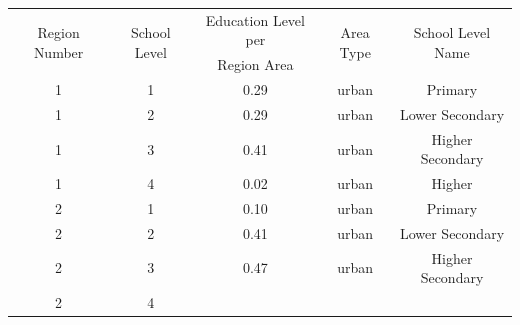 \documentclass[stu, 12pt, floatsintext,longtable]{apa7}
\begin{document}
\begin{longtable}{ccccc}
    \toprule
    \multicolumn{1}{c}{\multirow{2}{*}{Region Number}} &
    \multicolumn{1}{c}{\multirow{2}{*}{School Level}}  &
    \multicolumn{1}{c}{Education Level per}            &
    \multicolumn{1}{c}{\multirow{2}{*}{Area Type}}     &
    \multicolumn{1}{c}{\multirow{2}{*}{School Level Name}}
    \\
    \multicolumn{1}{c}{}                               & \multicolumn{1}{c}{}
                                                       & Region Area          &
    \multicolumn{1}{c}{}                               & \multicolumn{1}{c}{}
    \\
    \midrule
    1                                                  & 1                    &
    0.29
                                                       &
    urban                                              & Primary
    \\
    1                                                  & 2                    &
    0.29
                                                       &
    urban                                              & Lower Secondary
    \\
    1                                                  & 3                    &
    0.41
                                                       &
    urban                                              & Higher Secondary
    \\
    1                                                  & 4                    &
    0.02
                                                       &
    urban                                              & Higher
    \\
    2                                                  & 1                    &
    0.10
                                                       &
    urban                                              & Primary
    \\
    2                                                  & 2                    &
    0.41
                                                       &
    urban                                              & Lower Secondary
    \\
    2                                                  & 3                    &
    0.47
                                                       &
    urban                                              & Higher Secondary
    \\
    2                                                  & 4                    &

\end{longtable}
\end{document}
